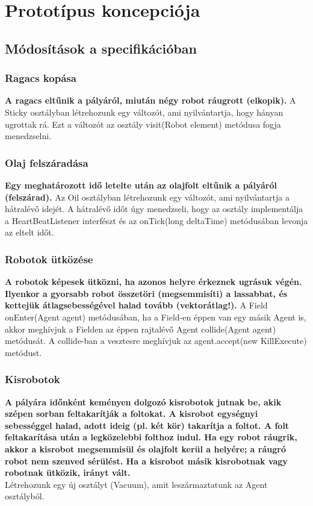 %
\chapter{Prototípus koncepciója}

\thispagestyle{fancy}

\setcounter{section}{-1}
\section{Módosítások a specifikációban}

\subsection{Ragacs kopása}
\textbf{A ragacs eltűnik a pályáról, miután négy robot ráugrott (elkopik).}\newline
A Sticky osztályban létrehozunk egy változót, ami nyilvántartja, hogy hányan ugrottak rá. Ezt a változót az osztály visit(Robot element) metódusa fogja menedzselni.

\subsection{Olaj felszáradása}
\textbf{Egy meghatározott idő letelte után az olajfolt eltűnik a pályáról (felszárad).}\newline
Az Oil osztályban létrehozunk egy változót, ami nyilvántartja a hátralévő idejét. A hátralévő időt úgy menedzseli, hogy az osztály implementálja a HeartBeatListener interfészt és az onTick(long deltaTime) metódusában levonja az eltelt időt.

\subsection{Robotok ütközése}
\textbf{A robotok képesek ütközni, ha azonos helyre érkeznek ugrásuk végén. Ilyenkor a gyorsabb robot összetöri (megsemmisíti) a lassabbat, és kettejük átlagsebességével halad tovább (vektorátlag!).}\newline
A Field onEnter(Agent agent) metódusában, ha a Field-en éppen van egy másik Agent is, akkor meghívjuk a Fielden az éppen rajtalévő Agent collide(Agent agent) metódusát. A collide-ban a vesztesre meghívjuk az agent.accept(new KillExecute) metódust.

\subsection{Kisrobotok}
\textbf{A pályára időnként keményen dolgozó kisrobotok jutnak be, akik szépen sorban feltakarítják a foltokat. A kisrobot egységnyi sebességgel halad, adott ideig (pl. két kör) takarítja a foltot. A folt feltakarítása után a legközelebbi folthoz indul. Ha egy robot ráugrik, akkor a kisrobot megsemmisül és olajfolt kerül a helyére; a ráugró robot nem szenved sérülést. Ha a kisrobot másik kisrobotnak vagy robotnak ütközik, irányt vált.}  \\
Létrehozunk egy új osztályt (Vacuum), amit leszármaztatunk az Agent osztályból.

